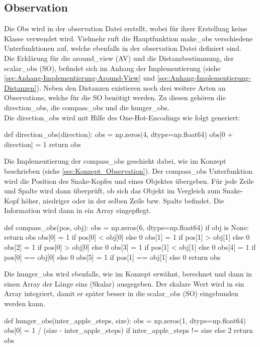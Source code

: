 \subsection{Observation} \label{sec:Implementierung_Observation}
Die Obs wird in der observation Datei erstellt, wobei für ihrer Erstellung keine Klasse verwendet wird. Vielmehr ruft die Hauptfunktion make\_obs verschiedene Unterfunktionen auf, welche ebenfalls in der observation Datei definiert sind.\\
Die Erklärung für die around\_view (AV) und die Distanzbestimmung, der scalar\_obs (SO), befindet sich im Anhang der Implementierung (siehe \ref{sec:Anhang-Implementierung-Around-View} und \ref{sec:Anhang-Implementierung-Distanzen}).
Neben den Distanzen existieren noch drei weitere Arten an Observations, welche für die SO benötigt werden. Zu diesen gehören die direction\_obs, die compass\_obs und die hunger\_obs.\\
Die direction\_obs wird mit Hilfe des One-Hot-Encodings wie folgt generiert:
\begin{python}
	def direction_obs(direction):
		obs = np.zeros(4, dtype=np.float64)
		obs[0 + direction] = 1
		return obs
\end{python}
Die Implementierung der compass\_obs geschieht dabei, wie im Konzept beschrieben (siehe \ref{sec:Konzept_Observation}). Der compass\_obs Unterfunktion wird die Position des Snake-Kopfes und eines Objektes übergeben. Für jede Zeile und Spalte wird dann überprüft, ob sich das Objekt im Vergleich zum Snake-Kopf höher, niedriger oder in der selben Zeile bzw. Spalte befindet. Die Information wird dann in ein Array eingepflegt.
\begin{python}
	def compass_obs(pos, obj):
		obs = np.zeros(6, dtype=np.float64)
		if obj is None:
			return obs
		obs[0] = 1 if pos[0] < obj[0] else 0
		obs[1] = 1 if pos[1] > obj[1] else 0
		obs[2] = 1 if pos[0] > obj[0] else 0
		obs[3] = 1 if pos[1] < obj[1] else 0
		obs[4] = 1 if pos[0] == obj[0] else 0
		obs[5] = 1 if pos[1] == obj[1] else 0
		return obs
\end{python}
Die hunger\_obs wird ebenfalls, wie im Konzept erwähnt, berechnet und dann in einen Array der Länge eins (Skalar) ausgegeben. Der skalare Wert wird in ein Array integriert, damit er später besser in die scalar\_obs (SO) eingebunden werden kann.
\begin{python}
	def hunger_obs(inter_apple_steps, size):
		obs = np.zeros(1, dtype=np.float64)
		obs[0] = 1 / (size - inter_apple_steps) if inter_apple_steps != size else 2
		return obs
\end{python}
